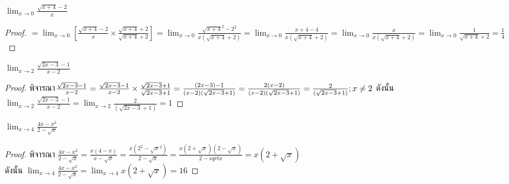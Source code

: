 \documentclass[a4paper,12pt]{scrartcl}
\begin{document}
\begin{example}
	$\lim_{x \to 0} \frac{\sqrt{x+4}-2}{x}$
\end{example}
\begin{proof}
$=\lim_{x \to 0} [\frac{\sqrt{x+4}-2}{x} \times \frac{\sqrt{x+4}+2}{\sqrt{x+4}+2} ] =\lim_{x \to 0} \frac{\sqrt{x+4}^2-2^2}{x(\sqrt{x+4}+2)}=\lim_{x \to 0} \frac{x+4-4}{x(\sqrt{x+4}+2)}= \lim_{x \to 0} \frac{x}{x(\sqrt{x+4}+2)} =\lim_{x \to 0} \frac{1}{\sqrt{x+4}+2} = \frac{1}{4} $
\end{proof}
\begin{example}
	$\lim_{x\to 2} \frac{\sqrt{2x-3}-1}{x-2}$
\end{example}
\begin{proof}
	พิจารณา$ \frac{\sqrt{2x-3}-1}{x-2} = \frac{\sqrt{2x-3}-1}{x-2} \times \frac{\sqrt{2x-3}+1}{\sqrt{2x-3}+1} = \frac{(2x-3)-1}{(x-2)(\sqrt{2x-3}+1)} = \frac{2(x-2)}{(x-2)(\sqrt{2x-3}+1)}=\frac{2}{(\sqrt{2x-3}+1)} \\ ; x \not = 2$ ดังนั้น $\lim_{x\to 2} \frac{\sqrt{2x-3}-1}{x-2} =\lim_{x\to 2} \frac{2}{(\sqrt{2x-3}+1)} = 1 $
\end{proof}
\begin{example}
	$\lim_{x \to 4} \frac{4x-x^2}{2-\sqrt{x}}$
\end{example}
\begin{proof}
	พิจารณา $\frac{4x-x^2}{2-\sqrt{x}}=\frac{x(4-x)}{x-\sqrt{x}}=\frac{x(2^2-\sqrt{x}^2)}{2-\sqrt{x}}=\frac{x(2+\sqrt{x})(2-\sqrt{x})}{2-sqrt{x}} = x(2+\sqrt{x})$ \\
	ดังนั้น $\lim_{x \to 4} \frac{4x-x^2}{2-\sqrt{x}} = \lim_{x \to 4} x(2+\sqrt{x}) =  16$
\end{proof}
\end{document}
